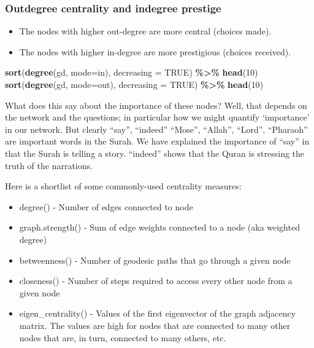 \documentclass[
]{article}
\newenvironment{Shaded}{\begin{snugshade}}{\end{snugshade}}
\newcommand{\AttributeTok}[1]{\textcolor[rgb]{0.13,0.29,0.53}{#1}}
\newcommand{\ConstantTok}[1]{\textcolor[rgb]{0.56,0.35,0.01}{#1}}
\newcommand{\DecValTok}[1]{\textcolor[rgb]{0.00,0.00,0.81}{#1}}
\newcommand{\FunctionTok}[1]{\textcolor[rgb]{0.13,0.29,0.53}{\textbf{#1}}}
\newcommand{\NormalTok}[1]{#1}
\newcommand{\SpecialCharTok}[1]{\textcolor[rgb]{0.81,0.36,0.00}{\textbf{#1}}}
\newcommand{\StringTok}[1]{\textcolor[rgb]{0.31,0.60,0.02}{#1}}
\providecommand{\tightlist}{%
  \setlength{\itemsep}{0pt}\setlength{\parskip}{0pt}}
\begin{document}
\normalsize

\hypertarget{outdegree-centrality-and-indegree-prestige}{%
\subsubsection{Outdegree centrality and indegree prestige}\label{outdegree-centrality-and-indegree-prestige}}

\begin{itemize}
\tightlist
\item
  The nodes with higher out-degree are more central (choices made).
\item
  The nodes with higher in-degree are more prestigious (choices received).
\end{itemize}

\footnotesize

\begin{Shaded}
\begin{Highlighting}[]
\FunctionTok{sort}\NormalTok{(}\FunctionTok{degree}\NormalTok{(gd, }\AttributeTok{mode=}\StringTok{\textquotesingle{}in\textquotesingle{}}\NormalTok{), }\AttributeTok{decreasing =} \ConstantTok{TRUE}\NormalTok{) }\SpecialCharTok{\%\textgreater{}\%} \FunctionTok{head}\NormalTok{(}\DecValTok{10}\NormalTok{)}
\FunctionTok{sort}\NormalTok{(}\FunctionTok{degree}\NormalTok{(gd, }\AttributeTok{mode=}\StringTok{\textquotesingle{}out\textquotesingle{}}\NormalTok{), }\AttributeTok{decreasing =} \ConstantTok{TRUE}\NormalTok{) }\SpecialCharTok{\%\textgreater{}\%} \FunctionTok{head}\NormalTok{(}\DecValTok{10}\NormalTok{)}
\end{Highlighting}
\end{Shaded}

\normalsize

What does this say about the importance of these nodes? Well, that depends on the network and the questions; in particular how we might quantify `importance' in our network. But clearly ``say'', ``indeed'' ``Mose'', ``Allah'', ``Lord'', ``Pharaoh'' are important words in the Surah. We have explained the importance of ``say'' in that the Surah is telling a story. ``indeed'' shows that the Quran is stressing the truth of the narrations.

Here is a shortlist of some commonly-used centrality measures:

\begin{itemize}
\tightlist
\item
  degree() - Number of edges connected to node
\item
  graph.strength() - Sum of edge weights connected to a node (aka weighted degree)
\item
  betweenness() - Number of geodesic paths that go through a given node
\item
  closeness() - Number of steps required to access every other node from a given node
\item
  eigen\_centrality() - Values of the first eigenvector of the graph adjacency matrix. The values are high for nodes that are connected to many other nodes that are, in turn, connected to many others, etc.
\end{itemize}
\end{document}
